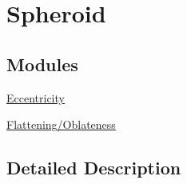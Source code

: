 \hypertarget{group___e_g_x_math-_geometry-3_d-_spheroid}{}\section{Spheroid}
\label{group___e_g_x_math-_geometry-3_d-_spheroid}
\subsection*{Modules}
\begin{DoxyCompactItemize}
\item 
\mbox{\hyperlink{group___e_g_x_math-_geometry-3_d-_spheroid-_eccentricity}{Eccentricity}}
\item 
\mbox{\hyperlink{group___e_g_x_math-_geometry-3_d-_spheroid-_flattening}{Flattening/\+Oblateness}}
\end{DoxyCompactItemize}


\subsection{Detailed Description}
